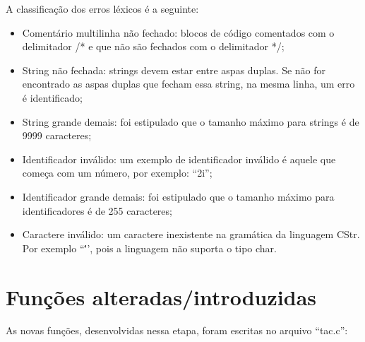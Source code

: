\documentclass[12pt]{article}
\begin{document}
A classificação dos erros léxicos é a seguinte:
\begin{itemize}
	\item Comentário multilinha não fechado: blocos de código comentados com o delimitador /* e que não são fechados com o delimitador */;
	\item String não fechada: strings devem estar entre aspas duplas. Se não for encontrado as aspas duplas que fecham essa string, na mesma linha, um erro é identificado;
	\item String grande demais: foi estipulado que o tamanho máximo para strings é de 9999 caracteres;
	\item Identificador inválido: um exemplo de identificador inválido é aquele que começa com um número, por exemplo: ``2i'';
	\item Identificador grande demais: foi estipulado que o tamanho máximo para identificadores é de 255 caracteres;
	\item Caractere inválido: um caractere inexistente na gramática da linguagem CStr. Por exemplo ``\''', pois a linguagem não suporta o tipo char.\\
\end{itemize}

\section{Funções alteradas/introduzidas}

\indent

As novas funções, desenvolvidas nessa etapa, foram escritas no arquivo ``tac.c'':
\end{document}

